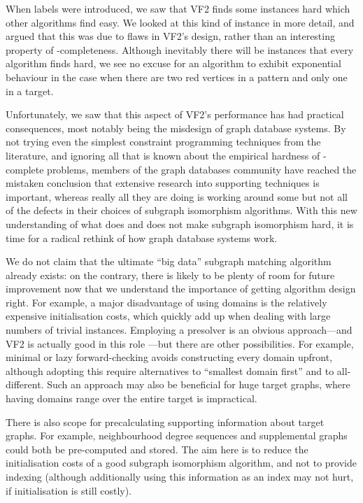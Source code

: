 \documentclass[twoside,11pt]{article}
\newcommand{\citep}[1]{\cite{#1}}
\begin{document}
When labels were introduced, we saw that VF2 finds some instances hard which other algorithms find
easy. We looked at this kind of instance in more detail, and argued that this was due to flaws in
VF2's design, rather than an interesting property of \NP-completeness. Although inevitably there
will be instances that every algorithm finds hard, we see no excuse for an algorithm to exhibit
exponential behaviour in the case when there are two red vertices in a pattern and only one in a
target.

Unfortunately, we saw that this aspect of VF2's performance has had practical consequences, most
notably being the misdesign of graph database systems. By not trying even the simplest constraint
programming techniques from the literature, and ignoring all that is known about the empirical
hardness of \NP-complete problems, members of the graph databases community have reached the mistaken
conclusion that extensive research into supporting techniques is important, whereas really all
they are doing is working around some but not all of the defects in their choices of subgraph
isomorphism algorithms. With this new understanding of what does and does not make subgraph
isomorphism hard, it is time for a radical rethink of how graph database systems work.

We do not claim that the ultimate ``big data'' subgraph matching algorithm already exists:
on the contrary, there is likely to be plenty of room for future improvement now that we understand
the importance of getting algorithm design right.  For example, a major disadvantage of using
domains is the relatively expensive initialisation costs, which quickly add up when dealing with
large numbers of trivial instances. Employing a presolver is an obvious approach---and VF2 is
actually good in this role \citep{DBLP:conf/lion/KotthoffMS16}---but there are other possibilities.
For example, minimal or lazy forward-checking
\citep{DBLP:conf/ictai/DentM94,DBLP:conf/cp/BacchusG95,o:Dent96,DBLP:conf/ecai/LarrosaM98} avoids
constructing every domain upfront, although adopting this require alternatives to ``smallest domain
first'' and to all-different. Such an approach may also be beneficial for huge target graphs, where
having domains range over the entire target is impractical.

There is also scope for precalculating supporting information about target graphs. For example,
neighbourhood degree sequences and supplemental graphs could both be pre-computed and stored. The aim
here is to reduce the initialisation costs of a good subgraph isomorphism algorithm, and not to
provide indexing (although additionally using this information as an index may not hurt, if
initialisation is still costly).
\end{document}
